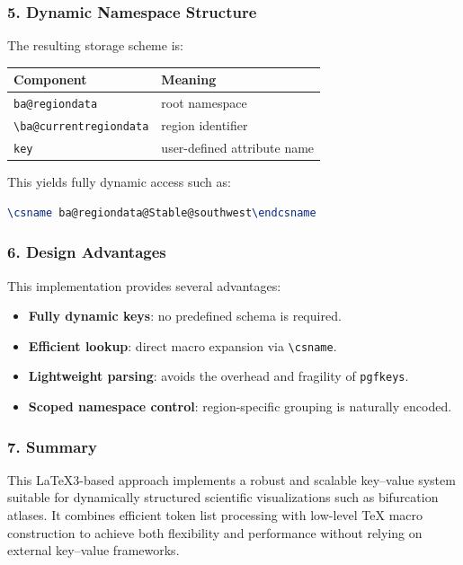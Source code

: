 \subsubsection*{5. Dynamic Namespace Structure}

The resulting storage scheme is:

\begin{center}
\begin{tabular}{ll}
\textbf{Component} & \textbf{Meaning} \\
\hline
\lstinline|ba@regiondata| & root namespace \\
\lstinline|\ba@currentregiondata| & region identifier \\
\lstinline|key| & user-defined attribute name \\
\end{tabular}
\end{center}

This yields fully dynamic access such as:

\begin{lstlisting}[language=LaTeX]
\csname ba@regiondata@Stable@southwest\endcsname
\end{lstlisting}

\subsubsection*{6. Design Advantages}

This implementation provides several advantages:

\begin{itemize}
\item \textbf{Fully dynamic keys}: no predefined schema is required.
\item \textbf{Efficient lookup}: direct macro expansion via \texttt{\textbackslash csname}.
\item \textbf{Lightweight parsing}: avoids the overhead and fragility of \texttt{pgfkeys}.
\item \textbf{Scoped namespace control}: region-specific grouping is naturally encoded.
\end{itemize}

\subsubsection*{7. Summary}

This \LaTeX3-based approach implements a robust and scalable key–value system suitable for dynamically structured scientific visualizations such as bifurcation atlases. It combines efficient token list processing with low-level TeX macro construction to achieve both flexibility and performance without relying on external key–value frameworks.